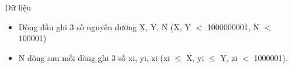 Dữ liệu
\begin{itemize}
	\item     Dòng đầu ghi 3 số nguyên dương X, Y, N (X, Y $<$ 1000000001, N $<$ 100001)   
	\item     N dòng sau mỗi dòng ghi 3 số xi, yi, zi (xi  $\le$  X, yi  $\le$  Y, zi $<$ 1000001).   
\end{itemize}